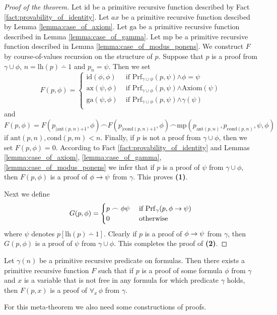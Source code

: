 \documentclass[10pt]{amsart}
\newcommand{\mand}{\boldsymbol{\wedge}}
\newcommand{\meq}{\boldsymbol{=}}
\newcommand{\mplus}{\boldsymbol{+}}
\begin{document}
\begin{proof}[Proof of the theorem]
  Let $\mathrm{id}$ be a primitive recursive function described by Fact \ref{fact:provability_of_identity}. Let $ax$ be a primitive recursive function descibed by Lemma \ref{lemma:case_of_axiom}. Let $\mathrm{ga}$ be a primitive recursive function described in Lemma \ref{lemma:case_of_gamma}. Let $\mathrm{mp}$ be a primitive recursive function described in Lemma \ref{lemma:case_of_modus_ponens}. We construct $F$ by course-of-values recursion on the structure of $p$. Suppose that $p$ is a proof from $\gamma \cup \phi$, $n = \mathrm{lh}(p) \dotminus 1$ and $p_n = \psi$. Then we set
  $$F(p,\phi) \meq \begin{cases}
    \mathrm{id}(\phi,\phi) &\mbox{ if }\mathrm{Prf}_{\gamma \cup \phi}(p,\psi) \mand \phi \meq \psi\\
    \mathrm{ax}(\psi,\phi) &\mbox{ if }\mathrm{Prf}_{\gamma \cup \phi}(p,\psi) \mand \mathrm{Axiom}(\psi)\\
    \mathrm{ga}(\psi,\phi) &\mbox{ if }\mathrm{Prf}_{\gamma \cup \phi}(p,\psi) \mand \gamma(\psi)\\
    \end{cases}$$
    and
  $$F(p,\phi) \meq F(p_{\mid \mathrm{ant}(p,n) \mplus 1},\phi) \frown F(p_{\mid \mathrm{cond}(p,n) \mplus 1},\phi)\frown \mathrm{mp}(p_{\mathrm{ant}(p,n)},p_{\mathrm{cond}(p,n)},\psi,\phi)$$
  if $\mathrm{ant}(p,n),\mathrm{cond}(p,m) < n$. Finally, if $p$ is not a proof from $\gamma \cup \phi$, then we set $F(p,\phi) \meq 0$. According to Fact \ref{fact:provability_of_identity} and Lemmas \ref{lemma:case_of_axiom}, \ref{lemma:case_of_gamma}, \ref{lemma:case_of_modus_ponens} we infer that if $p$ is a proof of $\psi$ from $\gamma \cup \phi$, then $F(p,\phi)$ is a proof of $\phi \rightarrow \psi$ from $\gamma$. This proves \textbf{(1)}.

    Next we define
    $$G(p,\phi) =\begin{cases}
      p\frown \phi\psi&\mbox{ if }\mathrm{Prf}_{\gamma}(p,\phi \rightarrow \psi)\\
     0&\mbox{ otherwise }\\
    \end{cases}$$
    where $\psi$ denotes $p[\mathrm{lh}(p) \dotminus 1]$. Clearly if $p$ is a proof of $\phi \rightarrow \psi$ from $\gamma$, then $G(p,\phi)$ is a proof of $\psi$ from $\gamma\cup \phi$. This completes the proof of \textbf{(2)}.
\end{proof}

\begin{theorem}
  Let $\gamma(n)$ be a primitive recursive predicate on formulas. Then there exists a primitive recursive function $F$ such that if $p$ is a proof of some formula $\phi$ from $\gamma$ and $x$ is a variable that is not free in any formula for which predicate $\gamma$ holds, then $F(p,x)$ is a proof of $\forall_x\,\phi$ from $\gamma$. 
\end{theorem}
\noindent
For this meta-theorem we also need some constructions of proofs.
\end{document}
